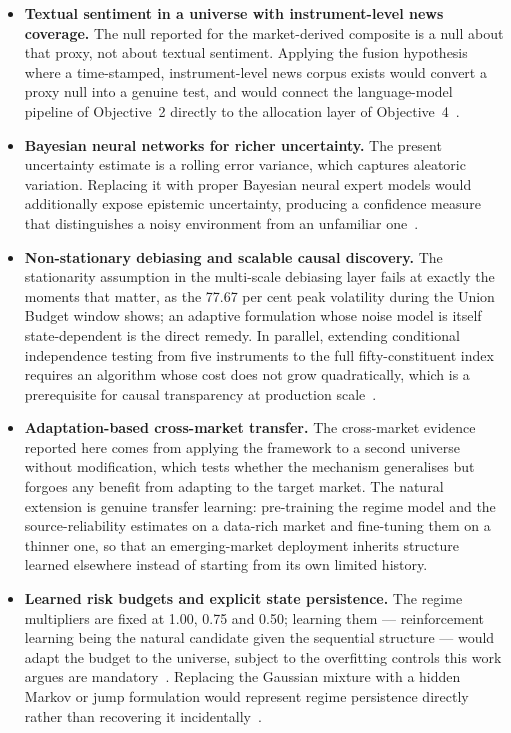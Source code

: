 \begin{itemize}
\item \textbf{Textual sentiment in a universe with instrument-level news coverage.} The
null reported for the market-derived composite is a null about that proxy, not about
textual sentiment. Applying the fusion hypothesis where a time-stamped, instrument-level
news corpus exists would convert a proxy null into a genuine test, and would connect the
language-model pipeline of Objective~2 directly to the allocation layer of
Objective~4~\cite{officioso2026,liu2024llmreview}.

\item \textbf{Bayesian neural networks for richer uncertainty.} The present uncertainty
estimate is a rolling error variance, which captures aleatoric variation. Replacing it
with proper Bayesian neural expert models would additionally expose epistemic uncertainty,
producing a confidence measure that distinguishes a noisy environment from an unfamiliar
one~\cite{khuwaja2023}.

\item \textbf{Non-stationary debiasing and scalable causal discovery.} The stationarity
assumption in the multi-scale debiasing layer fails at exactly the moments that matter, as
the 77.67 per cent peak volatility during the Union Budget window shows; an adaptive
formulation whose noise model is itself state-dependent is the direct remedy. In parallel,
extending conditional independence testing from five instruments to the full
fifty-constituent index requires an algorithm whose cost does not grow quadratically,
which is a prerequisite for causal transparency at production
scale~\cite{liu2026dynamic,spirtes2000}.

\item \textbf{Adaptation-based cross-market transfer.} The cross-market evidence reported
here comes from applying the framework to a second universe without modification, which
tests whether the mechanism generalises but forgoes any benefit from adapting to the target
market. The natural extension is genuine transfer learning: pre-training the regime model
and the source-reliability estimates on a data-rich market and fine-tuning them on a
thinner one, so that an emerging-market deployment inherits structure learned elsewhere
instead of starting from its own limited history.

\item \textbf{Learned risk budgets and explicit state persistence.} The regime multipliers
are fixed at 1.00, 0.75 and 0.50; learning them --- reinforcement learning being the
natural candidate given the sequential structure --- would adapt the budget to the
universe, subject to the overfitting controls this work argues are
mandatory~\cite{harvey2015}. Replacing the Gaussian mixture with a hidden Markov or jump
formulation would represent regime persistence directly rather than recovering it
incidentally~\cite{luo2026regime,hamilton1989}.


\end{itemize}
